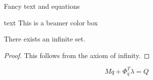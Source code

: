 \documentclass[11pt,t]{beamer}
\begin{document}
\begin{frame}{Fancy text and equations}
	\begin{center}
		\begin{beamercolorbox}[wd=0.4\textwidth,rounded=true,center]{text}
			This is a beamer color box
		\end{beamercolorbox}
	\end{center}
	\begin{theorem}
		There exists an infinite set.
	\end{theorem}
	\begin{proof}
		This follows from the axiom of infinity.
	\end{proof}
	\vspace{4mm}
	\begin{equation}
		M \ddot{q} + \mathsf{\Phi}_{q}^T \lambda = Q
	\end{equation}
\end{frame}
\end{document}
